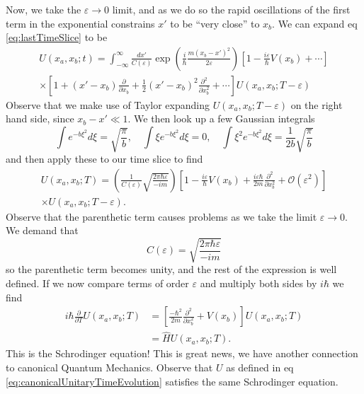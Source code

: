 Now, we take the $\varepsilon\to0$ limit, and as we do so the
rapid oscillations of the first term in the exponential
constrains $x'$ to be ``very close'' to $x_b$. We can expand eq
\eqref{eq:lastTimeSlice} to be
\begin{equation}\label{eq:expansionOfLastTimeSliceAsEpsilonToZero}
\begin{split}
U(x_a,x_b;t) =
\int^{\infty}_{-\infty}\frac{dx'}{C(\varepsilon)}\exp\left(\frac{i}{\hbar}\frac{m(x_b-x')^{2}}{2\varepsilon}\right)[1-\frac{i\varepsilon}{\hbar}V(x_b)+\cdots]\\
\times [1  + (x'- x_b)\frac{\partial}{\partial x_{b}} + \frac{1}{2}(x'- x_b)^{2}\frac{\partial^{2}}{\partial x_{b}^{2}}+\cdots]U(x_a,x_b;T-\varepsilon) 
\end{split}
\end{equation}
Observe that we make use of Taylor expanding
$U(x_a,x_b;T-\varepsilon)$ on the right hand side, since
$x_b-x'\ll1$. We then look up a few Gaussian integrals
\begin{equation}%
\int e^{-b\xi^{2}}d\xi = \sqrt{\frac{\pi}{b}},\quad\int\xi
e^{-b\xi^{2}}d\xi=0,\quad\int \xi^{2} e^{-b\xi^{2}}d\xi = \frac{1}{2b}\sqrt{\frac{\pi}{b}}
\end{equation}
and then apply these to our time slice to find
\begin{equation}%
\begin{split}
U(x_a,x_b;T) =
\left(\frac{1}{C(\varepsilon)}\sqrt{\frac{2\pi\hbar\varepsilon}{-im}}\right)\left[1
  - \frac{i\varepsilon}{\hbar}V(x_b) +
  \frac{i\varepsilon\hbar}{2m}\frac{\partial^{2}}{\partial
    x_{b}^{2}} + \mathcal{O}(\varepsilon^2)\right]\\
\times U(x_a,x_b;T-\varepsilon).
\end{split}
\end{equation}
Observe that the parenthetic term causes problems as we take the
limit $\varepsilon\to0$. We demand that
\begin{equation}%
C(\varepsilon) = \sqrt{\frac{2\pi\hbar\varepsilon}{-im}}
\end{equation}
so the parenthetic term becomes unity, and the rest of the
expression is well defined. If we now compare terms of order
$\varepsilon$ and multiply both sides by $i\hbar$ we find
\begin{subequations}
\begin{align}
i\hbar\frac{\partial}{\partial T}U(x_a,x_b;T)
&= \left[\frac{-\hbar^{2}}{2m}\frac{\partial^{2}}{\partial
    x_{b}^{2}}+V(x_{b})\right]U(x_{a},x_{b};T)\\
&= \hat{H}U(x_{a},x_{b};T).
\end{align}
\end{subequations}
This is the Schrodinger equation! This is great news, we have
another connection to canonical Quantum Mechanics. Observe that
$U$ as defined in eq \eqref{eq:canonicalUnitaryTimeEvolution}
satisfies the same Schrodinger equation.

